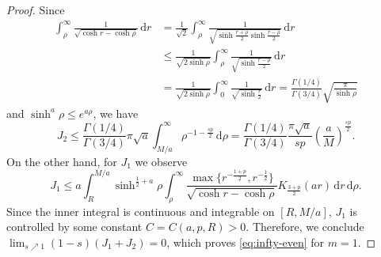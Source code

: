 \documentclass[11pt]{amsart}
\theoremstyle{plain}
\theoremstyle{definition}
\numberwithin{equation}{section}
\begin{document}
\begin{proof}
Since
\begin{equation*}
\begin{split}
\int_{\rho}^{\infty} \frac{1}{\sqrt{\cosh r - \cosh \rho}} \,\mathrm{d}r 
&= \frac{1}{\sqrt{2}} \int_{\rho}^{\infty} \frac{1}{\sqrt{\sinh\frac{r+\rho}{2} \sinh \frac{r-\rho}{2}}} \,\mathrm{d}r \\
&\leq \frac{1}{\sqrt{2\sinh \rho}} \int_{\rho}^{\infty} \frac{1}{\sqrt{\sinh\frac{r-\rho}{2}}} \,\mathrm{d}r \\
&= \frac{1}{\sqrt{2\sinh \rho}} \int_{0}^{\infty} \frac{1}{\sqrt{\sinh\frac{r}{2}}} \,\mathrm{d}r = \frac{\Gamma(1/4)}{\Gamma(3/4)}\sqrt{\frac{\pi}{\sinh \rho}}
\end{split}
\end{equation*}
and $\sinh^{a} \rho \leq e^{a\rho}$, we have
\begin{equation*}
J_{2} \leq \frac{\Gamma(1/4)}{\Gamma(3/4)} \pi \sqrt{a} \int_{M/a}^{\infty} \rho^{-1-\frac{sp}{2}} \,\mathrm{d}\rho = \frac{\Gamma(1/4)}{\Gamma(3/4)} \frac{\pi \sqrt{a}}{sp} \left( \frac{a}{M} \right)^{\frac{sp}{2}}.
\end{equation*}
On the other hand, for $J_{1}$ we observe
\begin{equation*}
J_{1} \leq a \int_{R}^{M/a} \sinh^{\frac{1}{2}+a}\rho \int_{\rho}^{\infty} \frac{\max \lbrace r^{-\frac{1+p}{2}}, r^{-\frac{1}{2}} \rbrace}{\sqrt{\cosh r - \cosh \rho}} K_{\frac{3+p}{2}}(ar) \,\mathrm{d}r \,\mathrm{d}\rho.
\end{equation*}
Since the inner integral is continuous and integrable on $[R, M/a]$, $J_{1}$ is controlled by some constant $C = C(a, p, R) > 0$. Therefore, we conclude $\lim_{s \nearrow 1} (1-s) (J_{1} + J_{2}) = 0$, which proves \eqref{eq:infty-even} for $m=1$.


\end{proof}
\end{document}
